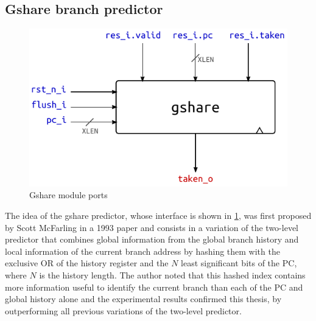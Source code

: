 \subsection{Gshare branch predictor}\label{sec:gshare}
\begin{figure}[hbt]
  \centering
  \includegraphics{img/gshare-top.pdf}
  \caption{Gshare module ports}
  \label{fig:gshare-top}
\end{figure}
The idea of the gshare predictor, whose interface is shown in \cref{fig:gshare-top}, was first proposed by Scott McFarling in a 1993 paper \cite{mcfarling93} and consists in a variation of the two-level predictor that combines global information from the global branch history and local information of the current branch address by hashing them with the exclusive OR of the history register and the $N$ least significant bits of the \ac{PC}, where $N$ is the history length. The author noted that this hashed index contains more information useful to identify the current branch than each of the \ac{PC} and global history alone and the experimental results confirmed this thesis, by outperforming all previous variations of the two-level predictor.

